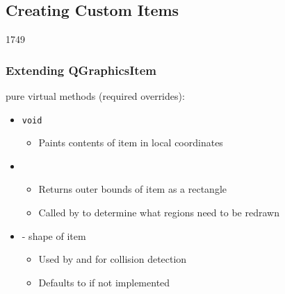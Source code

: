%
%
%
%

\subsection{Creating Custom Items}
\begin{slide}{1749}

\frametitle{Extending QGraphicsItem}
 pure virtual methods (required overrides):

\begin{itemize}
\item \texttt{void }
    \begin{itemize}
    \item Paints contents of item in local coordinates
    \end{itemize}
\item {} 
    \begin{itemize}
    \item Returns outer bounds of item as a rectangle 
    \item Called by  to determine what regions need to be redrawn

    \end{itemize}
      
\item {}  - shape of item
\begin{itemize}   
    \item Used by  and  for collision detection
    \item Defaults to  if not implemented
    \end{itemize}
\end{itemize}
\end{slide}


